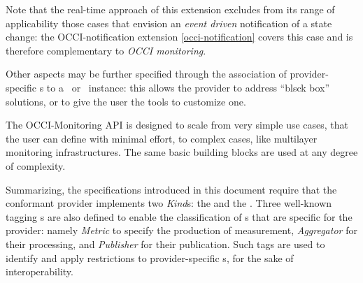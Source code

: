 \documentclass[10pt,a4paper]{article}
\begin{document}
Note that the real-time approach of this extension excludes from its range of applicability those cases that envision an {\em event driven} notification of a state change: the OCCI-notification extension \ref{occi-notification} covers this case and is therefore complementary to {\em OCCI monitoring}.

Other aspects may be further specified through the association of provider-specific \mi s to a \sens\ or \coll\ instance: this allows the provider to address ``blsck box'' solutions, or to give the user the tools to customize one.



The OCCI-Monitoring API is designed to scale from very simple use cases, that the user can define with minimal effort, to complex cases, like multilayer monitoring infrastructures. The same basic building blocks are used at any degree of complexity.




Summarizing, the specifications introduced in this document require that the conformant provider implements two {\em Kind}s: the {\em \coll } and the {\em \sens }. Three well-known tagging \mi s are also defined to enable the classification of \mi s that are specific for the provider: namely {\em Metric} to specify the production of measurement, {\em Aggregator} for their processing, and {\em Publisher} for their publication. Such tags are used to identify and apply restrictions to provider-specific \mi s, for the sake of interoperability.
\end{document}
